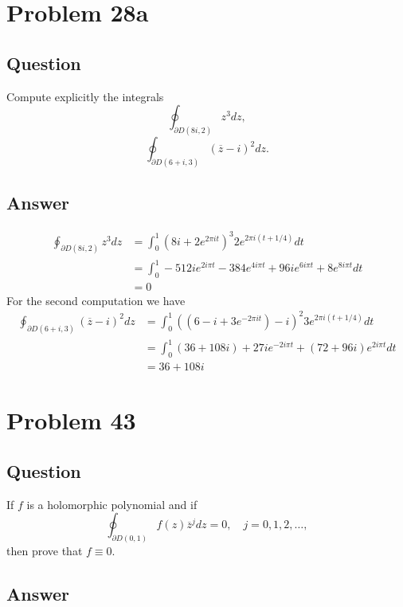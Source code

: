 \documentclass[11pt]{article}
\begin{document}
\section{Problem  28a}
\subsection{Question}
Compute explicitly the integrals
\[\oint_{\partial D(8i,2)} z^3 dz,\]
\[\oint_{\partial D(6+i,3)} (\overline{z} - i ) ^2 dz.\]
\subsection{Answer}
\begin{align*}
\oint_{\partial D(8i,2)} z^3 dz &= \int_0^1 (8 i + 2 e^{2 \pi i t })^3 2e^{2 \pi i (t+ 1/4 )} dt\\
&=  \int_0^1 -512 i e^{2 i \pi  t}-384 e^{4 i \pi  t}+96 i e^{6 i \pi  t}+8 e^{8 i \pi  t} dt\\
&=0
\end{align*}
For the second computation we have
\begin{align*}
\oint_{\partial D(6+i,3)} (\overline{z} - i ) ^2 dz &= \int_0^1  ( (6 - i+3e^{ - 2 \pi i t}) - i ) ^2  3e^{2 \pi i (t+ 1/4 )}  dt\\
&= \int_0^1 (36+108 i)+27 i e^{-2 i \pi  t}+(72+96 i) e^{2 i \pi  t}  dt\\
&= 36 + 108 i
\end{align*}


\section{Problem  43}
\subsection{Question}
If $f$ is a holomorphic polynomial and if
\[\oint_{\partial D(0,1)} f(z) \overline{z}^j dz =0, \quad j=0,1,2,\dots,\]
then prove that $f \equiv 0$.
\subsection{Answer}
\end{document}
